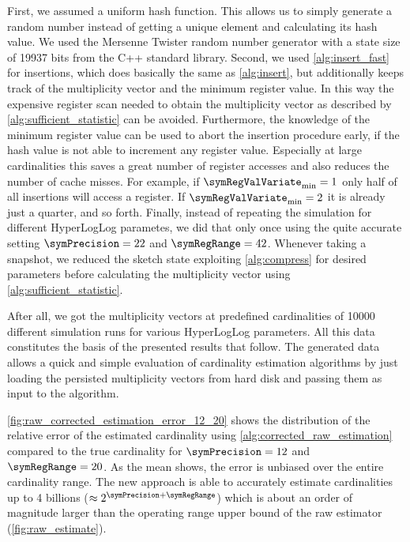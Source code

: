 \documentclass[a4paper]{scrartcl}
\begin{document}
First, we assumed a uniform hash function. This allows us to simply generate a random number instead of getting a unique element and calculating its hash value. We used the Mersenne Twister random number generator with a state size of \num{19937} bits from the C++ standard library. 
Second, we used \cref{alg:insert_fast} for insertions, which does basically the same as \cref{alg:insert}, but additionally keeps track of the multiplicity vector and the minimum register value. In this way the expensive register scan needed to obtain the multiplicity vector as described by \cref{alg:sufficient_statistic} can be avoided. Furthermore, the knowledge of the minimum register value can be used to abort the insertion procedure early, if the hash value is not able to increment any register value. Especially at large cardinalities this saves a great number of register accesses and also reduces the number of cache misses. For example, if $\symRegValVariate_\text{min}=1$ only half of all insertions will access a register. If $\symRegValVariate_\text{min}=2$ it is already just a quarter, and so forth. 
Finally, instead of repeating the simulation for different HyperLogLog parametes, we did that only once using the quite accurate setting $\symPrecision=22$ and $\symRegRange=42$.  Whenever taking a snapshot, we reduced the sketch state exploiting \cref{alg:compress} for desired parameters before calculating the multiplicity vector using \cref{alg:sufficient_statistic}.

After all, we got the multiplicity vectors at predefined cardinalities of \num{10000} different simulation runs for various HyperLogLog parameters. All this data constitutes the basis of the presented results that follow. The generated data allows a quick and simple evaluation of cardinality estimation algorithms by just loading the persisted multiplicity vectors from hard disk and passing them as input to the algorithm.

\cref{fig:raw_corrected_estimation_error_12_20} shows the distribution of the relative error of the estimated cardinality using \cref{alg:corrected_raw_estimation} compared to the true cardinality for $\symPrecision=12$ and $\symRegRange=20$. As the mean shows, the error is unbiased over the entire cardinality range. The new approach is able to accurately estimate cardinalities up to 4 billions ($\approx 2^{\symPrecision+\symRegRange}$) which is about an order of magnitude larger than the operating range upper bound of the raw estimator (\cref{fig:raw_estimate}).
\end{document}
